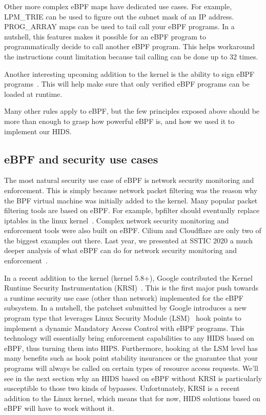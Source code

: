 Other more complex eBPF maps have dedicated use cases.
For example, LPM\_TRIE can be used to figure out the subnet mask of an IP address.
PROG\_ARRAY maps can be used to tail call your eBPF programs.
In a nutshell, this features makes it possible for an eBPF program to programmatically decide to call another eBPF program.
This helps workaround the instructions count limitation because tail calling can be done up to 32 times.

Another interesting upcoming addition to the kernel is the ability to sign eBPF programs~\cite{RuntimeSecurityMonitoringWithEBPF:SignedBPF}.
This will help make sure that only verified eBPF programs can be loaded at runtime.

Many other rules apply to eBPF, but the few principles exposed above should be more than enough to grasp how powerful eBPF is, and how we used it to implement our HIDS.

\subsection{eBPF and security use cases}

The most natural security use case of eBPF is network security monitoring and enforcement.
This is simply because network packet filtering was the reason why the BPF virtual machine was initially added to the kernel.
Many popular packet filtering tools are based on eBPF.
For example, bpfilter should eventually replace iptables in the linux kernel~\cite{RuntimeSecurityMonitoringWithEBPF:Firewall}.
Complex network security monitoring and enforcement tools were also built on eBPF.
Cilium and Cloudflare are only two of the biggest examples out there.
Last year, we presented at SSTIC 2020 a much deeper analysis of what eBPF can do for network security monitoring and enforcement~\cite{RuntimeSecurityMonitoringWithEBPF:NSP}.

In a recent addition to the kernel (kernel 5.8+), Google contributed the Kernel Runtime Security Instrumentation (KRSI)~\cite{RuntimeSecurityMonitoringWithEBPF:KRSI}.
This is the first major push towards a runtime security use case (other than network) implemented for the eBPF subsystem.
In a nutshell, the patchset submitted by Google introduces a new program type that leverages Linux Security Module (LSM)~\cite{RuntimeSecurityMonitoringWithEBPF:SecurityModule} hook points to implement a dynamic Mandatory Access Control with eBPF programs.
This technology will essentially bring enforcement capabilities to any HIDS based on eBPF, thus turning them into HIPS.
Furthermore, hooking at the LSM level has many benefits such as hook point stability insurances or the guarantee that your programs will always be called on certain types of resource access requests.
We’ll see in the next section why an HIDS based on eBPF without KRSI is particularly susceptible to those two kinds of bypasses.
Unfortunately, KRSI is a recent addition to the Linux kernel, which means that for now, HIDS solutions based on eBPF will have to work without it.

